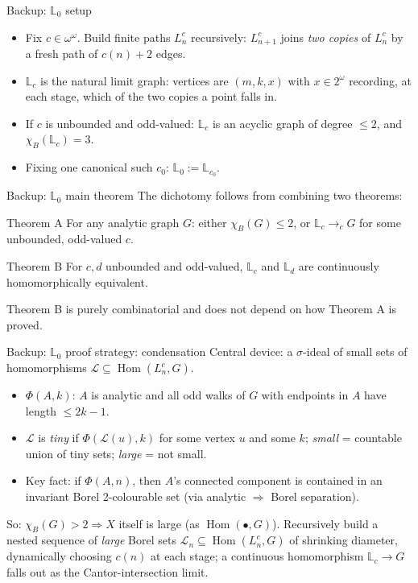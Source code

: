 \documentclass[aspectratio=169]{beamer}
\DeclareMathOperator{\Hom}{Hom}
\begin{document}
\begin{frame}{Backup: $\mathbb L_0$ setup}
  \begin{itemize}
    \item Fix $c\in\omega^\omega$. Build finite paths $L^c_n$ recursively: $L^c_{n+1}$ joins \emph{two copies} of $L^c_n$ by a fresh path of $c(n)+2$ edges.
    \item $\mathbb L_c$ is the natural limit graph: vertices are $(m,k,x)$ with $x\in 2^\omega$ recording, at each stage, which of the two copies a point falls in.
    \item If $c$ is unbounded and odd-valued: $\mathbb L_c$ is an acyclic graph of degree $\leq 2$, and $\chi_B(\mathbb L_c)=3$.
    \item Fixing one canonical such $c_0$: $\mathbb L_0 := \mathbb L_{c_0}$.
  \end{itemize}
\end{frame}

\begin{frame}{Backup: $\mathbb L_0$ main theorem}
  The dichotomy follows from combining two theorems:
  \begin{block}{Theorem A}
    For any analytic graph $G$: either $\chi_B(G)\leq 2$, or $\mathbb L_c\to_c G$ for some unbounded, odd-valued $c$.
  \end{block}
  \begin{block}{Theorem B}
    For $c,d$ unbounded and odd-valued, $\mathbb L_c$ and $\mathbb L_d$ are continuously homomorphically equivalent.
  \end{block}
  Theorem B is purely combinatorial and does not depend on how Theorem A is proved.
\end{frame}

\begin{frame}{Backup: $\mathbb L_0$ proof strategy: condensation}
  Central device: a $\sigma$-ideal of \alert{small} sets of homomorphisms $\mathcal L\subseteq\Hom(L^c_n,G)$.
  \begin{itemize}
    \item $\Phi(A,k)$: $A$ is analytic and all odd walks of $G$ with endpoints in $A$ have length $\leq 2k-1$.
    \item $\mathcal L$ is \emph{tiny} if $\Phi(\mathcal L(u),k)$ for some vertex $u$ and some $k$; \emph{small} = countable union of tiny sets; \emph{large} = not small.
    \item Key fact: if $\Phi(A,n)$, then $A$'s connected component is contained in an invariant Borel 2-colourable set (via analytic $\Rightarrow$ Borel separation).
  \end{itemize}
  So: $\chi_B(G)>2 \Rightarrow X$ itself is large (as $\Hom(\bullet,G)$). Recursively build a nested sequence of \emph{large} Borel sets $\mathcal L_n\subseteq\Hom(L^c_n,G)$ of shrinking diameter, dynamically choosing $c(n)$ at each stage; a continuous homomorphism $\mathbb L_c\to G$ falls out as the Cantor-intersection limit.
\end{frame}
\end{document}
